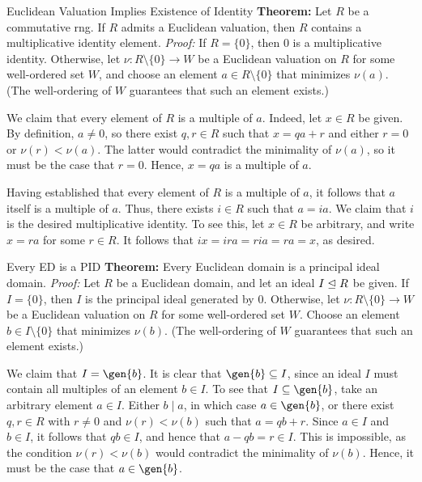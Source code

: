 \begin{thmbox}{Euclidean Valuation Implies Existence of Identity}
	\textbf{Theorem:} Let $R$ be a commutative rng. If $R$ admits a Euclidean valuation, then $R$ contains a multiplicative identity element.
\tcblower
	\textit{Proof:} If $R = \{0\}$, then $0$ is a multiplicative identity. Otherwise, let $\nu: R \setminus \{0\} \to W$ be a Euclidean valuation on $R$ for some well-ordered set $W$, and choose an element $a \in R \setminus \{0\}$ that minimizes $\nu(a)$. (The well-ordering of $W$ guarantees that such an element exists.)

	We claim that every element of $R$ is a multiple of $a$. Indeed, let $x \in R$ be given. By definition, $a \ne 0$, so there exist $q, r \in R$ such that $x = qa + r$ and either $r = 0$ or $\nu(r) < \nu(a)$. The latter would contradict the minimality of $\nu(a)$, so it must be the case that $r = 0$. Hence, $x = qa$ is a multiple of $a$.

	Having established that every element of $R$ is a multiple of $a$, it follows that $a$ itself is a multiple of $a$. Thus, there exists $i \in R$ such that $a = ia$. We claim that $i$ is the desired multiplicative identity. To see this, let $x \in R$ be arbitrary, and write $x = ra$ for some $r \in R$. It follows that $ix = ira = ria = ra = x$, as desired.
\end{thmbox}

\begin{thmbox}{Every ED is a PID}
	\textbf{Theorem:} Every Euclidean domain is a principal ideal domain.
\tcblower
	\textit{Proof:} Let $R$ be a Euclidean domain, and let an ideal $I \trianglelefteq R$ be given. If $I = \{0\}$, then $I$ is the principal ideal generated by $0$. Otherwise, let $\nu: R \setminus \{0\} \to W$ be a Euclidean valuation on $R$ for some well-ordered set $W$. Choose an element $b \in I \setminus \{0\}$ that minimizes $\nu(b)$. (The well-ordering of $W$ guarantees that such an element exists.)

	We claim that $I = \gen{b}$. It is clear that $\gen{b} \subseteq I$, since an ideal $I$ must contain all multiples of an element $b \in I$. To see that $I \subseteq \gen{b}$, take an arbitrary element $a \in I$. Either $b \mid a$, in which case $a \in \gen{b}$, or there exist $q, r \in R$ with $r \ne 0$ and $\nu(r) < \nu(b)$ such that $a = qb + r$. Since $a \in I$ and $b \in I$, it follows that $qb \in I$, and hence that $a - qb = r \in I$. This is impossible, as the condition $\nu(r) < \nu(b)$ would contradict the minimality of $\nu(b)$. Hence, it must be the case that $a \in \gen{b}$.
\end{thmbox}
